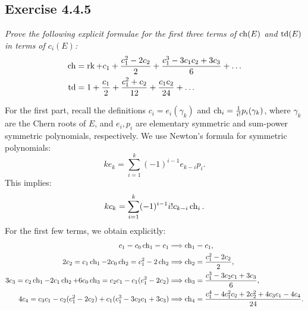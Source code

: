 \documentclass{article}
\begin{document}
\subsection*{Exercise 4.4.5}
\emph{Prove the following explicit formulae for the first three terms of $\operatorname{ch}(E)$ and $\operatorname{td}(E)$ in terms of $c_i(E)$:}
\begin{align*}
\operatorname{ch} &= \operatorname{rk} + c_1 + \frac{c_1^2 - 2c_2}{2} + \frac{c_1^3 - 3c_1 c_2 + 3c_3}{6} + \dots \\
\operatorname{td} &= 1 + \frac{c_1}{2} + \frac{c_1^2 + c_2}{12} + \frac{c_1c_2}{24} + \dots
\end{align*}
\vspace{3mm}


For the first part, recall the definitions $c_i = e_i(\gamma_k)$ and $\operatorname{ch}_i = \frac{1}{i!} p_i(\gamma_k)$, where
$\gamma_k$ are the Chern roots of $E$, and $e_i, p_i$ are elementary symmetric and sum-power symmetric polynomials,
respectively. We use Newton's formula for symmetric polynomials:
\[	ke_k = \sum_{i=1}^k (-1)^{i-1} e_{k-i} p_i .	\]
This implies:
\[	k c_k = \sum_{i=1}^k (-1)^{i-1} i! c_{k-i} \operatorname{ch}_i.	\]
For the first few terms, we obtain explicitly:
\begin{align*}
c_1 = c_0 \operatorname{ch}_1 = c_1 &\Longrightarrow \operatorname{ch}_1 = c_1, \\
2c_2 = c_1 \operatorname{ch}_1 - 2c_0 \operatorname{ch}_2 = c_1^2 - 2\operatorname{ch}_2 &\Longrightarrow \operatorname{ch}_2 = \frac{c_1^2 - 2c_2}{2}, \\
3c_3 = c_2\operatorname{ch}_1 - 2c_1 \operatorname{ch}_2 + 6c_0\operatorname{ch}_3 = c_2c_1 - c_1(c_1^2 - 2c_2) &\Longrightarrow \operatorname{ch}_3 = 
\frac{c_1^3 - 3c_2c_1 + 3c_3}{6}, \\
4c_4 = c_3c_1 - c_2(c_1^2 - 2c_2) + c_1(c_1^3 - 3c_2c_1 + 3c_3) &\Longrightarrow \operatorname{ch}_4 = 
\frac{c_1^4 - 4c_1^2 c_2 + 2c_2^2 + 4c_3c_1 - 4c_4}{24}.
\end{align*}
\end{document}
